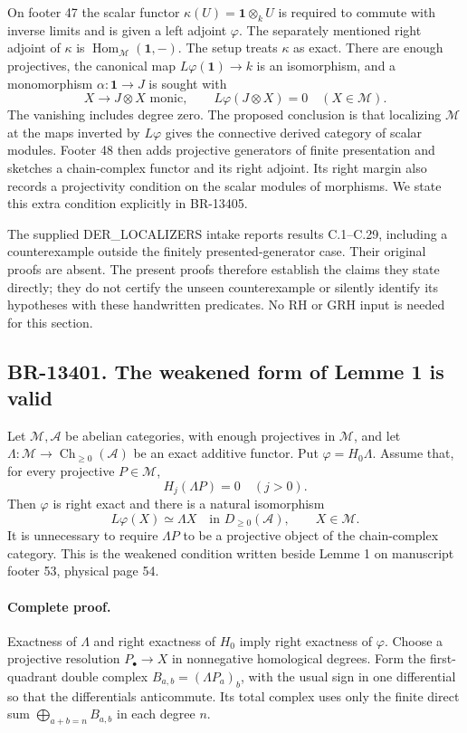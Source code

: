 \documentclass[11pt,a4paper]{article}
\theoremstyle{definition}\newtheorem{definition}[theorem]{Definition}
\theoremstyle{remark}\newtheorem{remark}[theorem]{Remark}
\begin{document}
On footer 47 the scalar functor \(\kappa(U)=\mathbf1\otimes_k U\)
is required to commute with inverse limits and is given a left adjoint
\(\varphi\).  The separately mentioned right adjoint of \(\kappa\)
is \(\operatorname{Hom}_{\mathcal M}(\mathbf1,-)\).  The setup treats
\(\kappa\) as exact.  There are enough projectives, the canonical
map \(L\varphi(\mathbf1)\to k\) is an isomorphism, and a monomorphism
\(\alpha:\mathbf1\to J\) is sought with
\[
 X\longrightarrow J\otimes X\text{ monic},\qquad
 L\varphi(J\otimes X)=0\quad(X\in\mathcal M).
 \tag{134.1}
\]
The vanishing includes degree zero.  The proposed conclusion is that
localizing \(\mathcal M\) at the maps inverted by \(L\varphi\)
gives the connective derived category of scalar modules.  Footer 48
then adds projective generators of finite presentation and sketches a
chain-complex functor and its right adjoint.  Its right margin also
records a projectivity condition on the scalar modules of morphisms.
We state this extra condition explicitly in BR-13405.

The supplied DER\_LOCALIZERS intake reports results C.1--C.29,
including a counterexample outside the finitely presented-generator
case.  Their original proofs are absent.  The present proofs therefore
establish the claims they state directly; they do not certify the
unseen counterexample or silently identify its hypotheses with these
handwritten predicates.  No RH or GRH input is needed for this section.

\subsection{BR-13401. The weakened form of Lemme 1 is valid}
Let \(\mathcal M,\mathcal A\) be abelian categories, with enough
projectives in \(\mathcal M\), and let
\(\Lambda:\mathcal M\to\operatorname{Ch}_{\geq0}(\mathcal A)\)
be an exact additive functor.  Put \(\varphi=H_0\Lambda\).
Assume that, for every projective \(P\in\mathcal M\),
\[
 H_j(\Lambda P)=0\quad(j>0).
 \tag{134.2}
\]
Then \(\varphi\) is right exact and there is a natural isomorphism
\[
 L\varphi(X)\simeq\Lambda X
 \quad\text{in }D_{\geq0}(\mathcal A),\qquad X\in\mathcal M.
 \tag{134.3}
\]
It is unnecessary to require \(\Lambda P\) to be a projective object
of the chain-complex category.  This is the weakened condition written
beside Lemme 1 on manuscript footer 53, physical page 54.

\paragraph{Complete proof.}
Exactness of \(\Lambda\) and right exactness of \(H_0\) imply right
exactness of \(\varphi\).  Choose a projective resolution
\(P_\bullet\to X\) in nonnegative homological degrees.  Form the
first-quadrant double complex
\(B_{a,b}=(\Lambda P_a)_b\), with the usual sign in one
differential so that the differentials anticommute.  Its total complex
uses only the finite direct sum \(\bigoplus_{a+b=n}B_{a,b}\) in each
degree \(n\).
\end{document}
